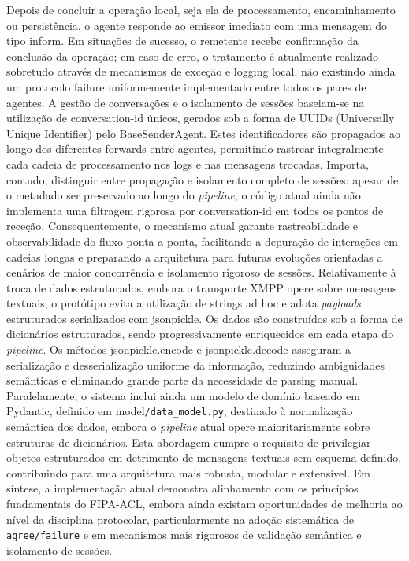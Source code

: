 \documentclass[runningheads]{llncs}
\begin{document}
Depois de concluir a operação local, seja ela de processamento, encaminhamento ou persistência, o agente responde ao emissor imediato com uma mensagem do tipo inform. Em situações de sucesso, o remetente recebe confirmação da conclusão da operação; em caso de erro, o tratamento é atualmente realizado sobretudo através de mecanismos de exceção e logging local, não existindo ainda um protocolo failure uniformemente implementado entre todos os pares de agentes. 
A gestão de conversações e o isolamento de sessões baseiam-se na utilização de conversation-id únicos, gerados sob a forma de UUIDs (Universally Unique Identifier) pelo BaseSenderAgent. Estes identificadores são propagados ao longo dos diferentes forwards entre agentes, permitindo rastrear integralmente cada cadeia de processamento nos logs e nas mensagens trocadas. Importa, contudo, distinguir entre propagação e isolamento completo de sessões: apesar de o metadado ser preservado ao longo do \textit{pipeline}, o código atual ainda não implementa uma filtragem rigorosa por conversation-id em todos os pontos de receção. Consequentemente, o mecanismo atual garante rastreabilidade e observabilidade do fluxo ponta-a-ponta, facilitando a depuração de interações em cadeias longas e preparando a arquitetura para futuras evoluções orientadas a cenários de maior concorrência e isolamento rigoroso de sessões. 
Relativamente à troca de dados estruturados, embora o transporte XMPP opere sobre mensagens textuais, o protótipo evita a utilização de strings ad hoc e adota \textit{payloads} estruturados serializados com jsonpickle. Os dados são construídos sob a forma de dicionários estruturados, sendo progressivamente enriquecidos em cada etapa do \textit{pipeline}. Os métodos jsonpickle.encode e jsonpickle.decode asseguram a serialização e desserialização uniforme da informação, reduzindo ambiguidades semânticas e eliminando grande parte da necessidade de parsing manual.  
Paralelamente, o sistema inclui ainda um modelo de domínio baseado em Pydantic, definido em model\texttt{/data\_model.py}, destinado à normalização semântica dos dados, embora o \textit{pipeline} atual opere maioritariamente sobre estruturas de dicionários. Esta abordagem cumpre o requisito de privilegiar objetos estruturados em detrimento de mensagens textuais sem esquema definido, contribuindo para uma arquitetura mais robusta, modular e extensível. 
Em síntese, a implementação atual demonstra alinhamento com os princípios fundamentais do FIPA-ACL, embora ainda existam oportunidades de melhoria ao nível da disciplina protocolar, particularmente na adoção sistemática de \texttt{agree/failure} e em mecanismos mais rigorosos de validação semântica e isolamento de sessões. 
\end{document}
